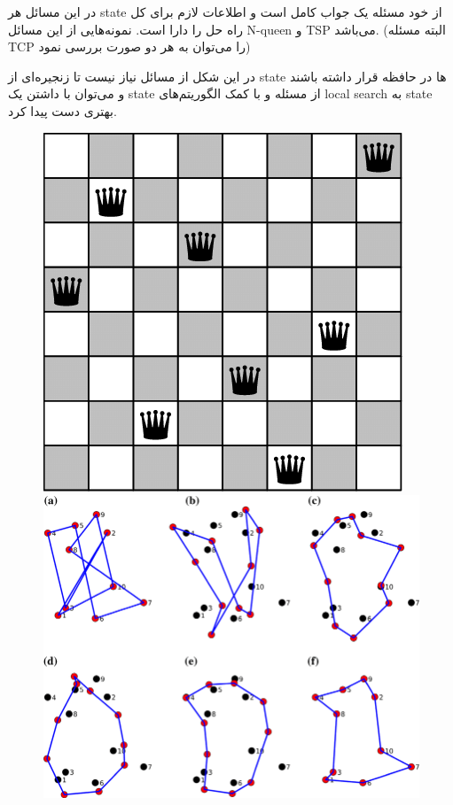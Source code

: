 در این مسائل هر state از خود مسئله یک جواب کامل است و اطلاعات لازم برای کل راه حل را دارا است.
نمونه‌هایی از این مسائل N-queen و TSP می‌باشد. (البته مسئله TCP را می‌توان به هر دو صورت بررسی نمود)

در این شکل از مسائل نیاز نیست تا زنجیره‌ای از state ها در حافظه قرار داشته باشند و می‌توان با داشتن یک state از مسئله و با کمک الگوریتم‌های local search به state بهتری دست پیدا کرد.
\begin{figure}[H]
    \includegraphics[width=\linewidth]{source/N-queen.png}
    \label{fig:HDD-to-Drive}
    \endminipage\hfill
    \includegraphics[width=\linewidth]{source/TSP.png}
    \label{fig:SSD-to-Drive}
    \endminipage\hfill
\end{figure}

